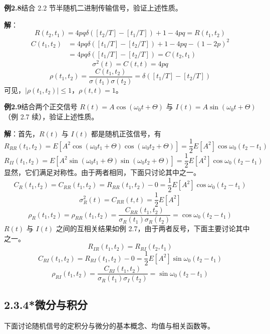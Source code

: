 \documentclass[11pt,openany,UTF8]{ctexbook}
\newcommand{\E}{E}                                 %
\begin{document}
\begin{examplebox}
\textbf{例2.8}\quad 结合 2.2 节半随机二进制传输信号\nobreak，验证上述性质\nobreak。%

\textbf{解}\nobreak：
\[
R(t_2,t_1)=4pq\delta([t_2/T]-[t_1/T])+1-4pq=R(t_1,t_2)
\]
\[
\begin{aligned}
C(t_1,t_2)&=4pq\delta([t_1/T]-[t_2/T])+1-4pq-(1-2p)^2\\
&=4pq\delta([t_1/T]-[t_2/T])=C(t_2,t_1)
\end{aligned}
\]
\[
\sigma^2(t)=C(t,t)=4pq
\]
\[
\rho(t_1,t_2)=\frac{C(t_1,t_2)}{\sigma(t_1)\sigma(t_2)}=\delta([t_1/T]-[t_2/T])
\]
可见\nobreak，$\lvert\rho(t_1,t_2)\rvert\leqslant 1$\nobreak，$\rho(t,t)=1$\nobreak。

\textbf{例2.9}\quad 结合两个正交信号 $R(t)=A\cos(\omega_0 t+\Theta)$ 与 $I(t)=A\sin(\omega_0 t+\Theta)$（例 2.7 续\nobreak）\nobreak，验证上述性质\nobreak。

\textbf{解}\nobreak：首先\nobreak，$R(t)$ 与 $I(t)$ 都是随机正弦信号\nobreak，有
\[
R_{RR}(t_1,t_2)=\E\left[A^2\cos(\omega_0 t_1+\Theta)\cos(\omega_0 t_2+\Theta)\right]=\frac{1}{2}\E[A^2]\cos\omega_0(t_2-t_1)
\]
\[
R_{II}(t_1,t_2)=\E\left[A^2\sin(\omega_0 t_1+\Theta)\sin(\omega_0 t_2+\Theta)\right]=\frac{1}{2}\E[A^2]\cos\omega_0(t_2-t_1)
\]
显然\nobreak，它们满足对称性\nobreak。由于两者相同\nobreak，下面只讨论其中之一\nobreak。
\[
C_R(t_1,t_2)=C_{RR}(t_1,t_2)=R_{RR}(t_1,t_2)-0=\frac{1}{2}\E[A^2]\cos\omega_0(t_2-t_1)
\]
\[
\sigma_R^2(t)=C_{RR}(t,t)=\frac{1}{2}\E[A^2]
\]
\[
\rho_R(t_1,t_2)=\rho_{RR}(t_1,t_2)=\frac{C_{RR}(t_1,t_2)}{\sigma_R(t_1)\sigma_R(t_2)}=\cos\omega_0(t_2-t_1)
\]
$R(t)$ 与 $I(t)$ 之间的互相关结果如例 2.7\nobreak，由于两者反号\nobreak，下面主要讨论其中之一\nobreak。
\[
R_{IR}(t_1,t_2)=R_{RI}(t_2,t_1)
\]
\[
C_{RI}(t_1,t_2)=R_{RI}(t_1,t_2)-0=\frac{1}{2}\E[A^2]\sin\omega_0(t_2-t_1)
\]
\[
\rho_{RI}(t_1,t_2)=\frac{C_{RI}(t_1,t_2)}{\sigma_R(t_1)\sigma_I(t_2)}=\sin\omega_0(t_2-t_1)
\]
\end{examplebox}

\subsection*{2.3.4*\quad 微分与积分}
下面讨论随机信号的定积分与微分的基本概念\nobreak、均值与相关函数等\nobreak。
\end{document}

